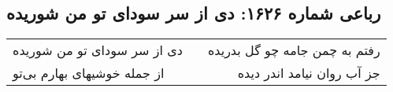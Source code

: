 \begin{center}
\section*{رباعی شماره ۱۶۲۶: دی از سر سودای تو من شوریده}
\label{sec:1626}
\begin{longtable}{l p{0.5cm} r}
دی از سر سودای تو من شوریده
&&
رفتم به چمن جامه چو گل بدریده
\\
از جمله خوشیهای بهارم بی‌تو
&&
جز آب روان نیامد اندر دیده
\\
\end{longtable}
\end{center}
